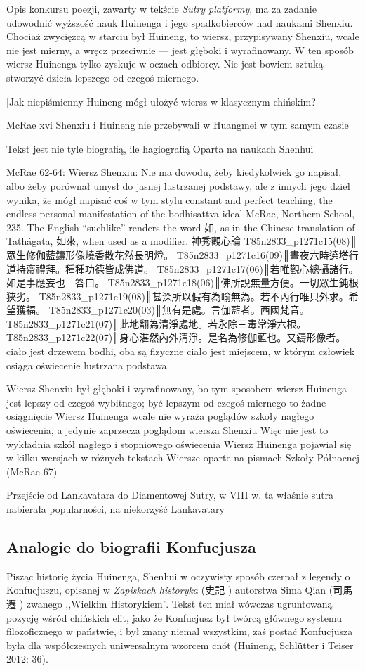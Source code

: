 Opis konkursu poezji, zawarty w tekście \textit{Sutry platformy}, ma za zadanie udowodnić wyższość nauk Huinenga i jego spadkobierców nad naukami Shenxiu. Chociaż zwycięzcą w starciu był Huineng, to wiersz, przypisywany Shenxiu, wcale nie jest mierny, a wręcz przeciwnie --- jest głęboki i wyrafinowany. W ten sposób wiersz Huinenga tylko zyskuje w oczach odbiorcy. Nie jest bowiem sztuką stworzyć dzieła lepszego od czegoś miernego.

[Jak niepiśmienny Huineng mógł ułożyć wiersz w klasycznym chińskim?]

McRae xvi
Shenxiu i Huineng nie przebywali w Huangmei w tym samym czasie

Tekst jest nie tyle biografią, ile hagiografią
Oparta na naukach Shenhui

McRae 62-64:
Wiersz Shenxiu:
Nie ma dowodu, żeby kiedykolwiek go napisał, albo żeby porównał umysł do jasnej lustrzanej podstawy, ale z innych jego dzieł wynika, że mógł napisać coś w tym stylu
constant and perfect teaching, the endless personal manifestation of the
bodhisattva ideal
McRae, Northern School, 235. The English “suchlike'' renders the word 如, as in the Chinese translation of Tathágata, 如來, when used as a modifier.
神秀觀心論
T85n2833_p1271c15(08)║眾生修伽藍鑄形像燒香散花然長明燈。
T85n2833_p1271c16(09)║晝夜六時遶塔行道持齋禮拜。種種功德皆成佛道。
T85n2833_p1271c17(06)║若唯觀心總攝諸行。如是事應妄也　答曰。
T85n2833_p1271c18(06)║佛所說無量方便。一切眾生鈍根狹劣。
T85n2833_p1271c19(08)║甚深所以假有為喻無為。若不內行唯只外求。希望獲福。
T85n2833_p1271c20(03)║無有是處。言伽藍者。西國梵音。
T85n2833_p1271c21(07)║此地翻為清淨處地。若永除三毒常淨六根。
T85n2833_p1271c22(07)║身心湛然內外清淨。是名為修伽藍也。又鑄形像者。
ciało jest drzewem bodhi, oba są fizyczne
ciało jest miejscem, w którym człowiek osiąga oświecenie
lustrzana podstawa

Wiersz Shenxiu był głęboki i wyrafinowany, bo tym sposobem wiersz Huinenga jest lepszy od czegoś wybitnego; być lepszym od czegoś miernego to żadne osiągnięcie
Wiersz Huinenga wcale nie wyraża poglądów szkoły nagłego oświecenia, a jedynie zaprzecza poglądom wiersza Shenxiu
Więc nie jest to wykładnia szkół nagłego i stopniowego oświecenia
Wiersz Huinenga pojawiał się w kilku wersjach w różnych tekstach
Wiersze oparte na pismach Szkoły Północnej (McRae 67)

Przejście od Lankavatara do Diamentowej Sutry, w VIII w. ta właśnie sutra nabierała popularności, na niekorzyść Lankavatary
\fi
\subsection{Analogie do biografii Konfucjusza}
Pisząc historię życia Huinenga, Shenhui w oczywisty sposób czerpał z legendy o Konfucjuszu, opisanej w \textit{Zapiskach historyka} (史記 ) autorstwa Sima Qian (司馬遷 ) zwanego ,,Wielkim Historykiem''. Tekst ten miał wówczas ugruntowaną pozycję wśród chińskich elit, jako że Konfucjusz był twórcą głównego systemu filozoficznego w państwie, i był znany niemal wszystkim, zaś postać Konfucjusza była dla współczesnych uniwersalnym wzorcem cnót (Huineng, Schlütter i Teiser 2012: 36).

